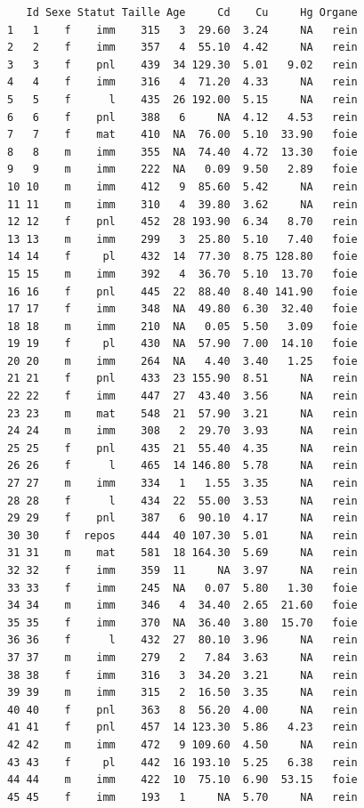 \documentclass[
  a4paper,
  DIV=11,
  numbers=noendperiod,
  oneside]{scrreprt}
\begin{document}
\begin{verbatim}
   Id Sexe Statut Taille Age     Cd    Cu     Hg Organe
1   1    f    imm    315   3  29.60  3.24     NA   rein
2   2    f    imm    357   4  55.10  4.42     NA   rein
3   3    f    pnl    439  34 129.30  5.01   9.02   rein
4   4    f    imm    316   4  71.20  4.33     NA   rein
5   5    f      l    435  26 192.00  5.15     NA   rein
6   6    f    pnl    388   6     NA  4.12   4.53   rein
7   7    f    mat    410  NA  76.00  5.10  33.90   foie
8   8    m    imm    355  NA  74.40  4.72  13.30   foie
9   9    m    imm    222  NA   0.09  9.50   2.89   foie
10 10    m    imm    412   9  85.60  5.42     NA   rein
11 11    m    imm    310   4  39.80  3.62     NA   rein
12 12    f    pnl    452  28 193.90  6.34   8.70   rein
13 13    m    imm    299   3  25.80  5.10   7.40   foie
14 14    f     pl    432  14  77.30  8.75 128.80   foie
15 15    m    imm    392   4  36.70  5.10  13.70   foie
16 16    f    pnl    445  22  88.40  8.40 141.90   foie
17 17    f    imm    348  NA  49.80  6.30  32.40   foie
18 18    m    imm    210  NA   0.05  5.50   3.09   foie
19 19    f     pl    430  NA  57.90  7.00  14.10   foie
20 20    m    imm    264  NA   4.40  3.40   1.25   foie
21 21    f    pnl    433  23 155.90  8.51     NA   rein
22 22    f    imm    447  27  43.40  3.56     NA   rein
23 23    m    mat    548  21  57.90  3.21     NA   rein
24 24    m    imm    308   2  29.70  3.93     NA   rein
25 25    f    pnl    435  21  55.40  4.35     NA   rein
26 26    f      l    465  14 146.80  5.78     NA   rein
27 27    m    imm    334   1   1.55  3.35     NA   rein
28 28    f      l    434  22  55.00  3.53     NA   rein
29 29    f    pnl    387   6  90.10  4.17     NA   rein
30 30    f  repos    444  40 107.30  5.01     NA   rein
31 31    m    mat    581  18 164.30  5.69     NA   rein
32 32    f    imm    359  11     NA  3.97     NA   rein
33 33    f    imm    245  NA   0.07  5.80   1.30   foie
34 34    m    imm    346   4  34.40  2.65  21.60   foie
35 35    f    imm    370  NA  36.40  3.80  15.70   foie
36 36    f      l    432  27  80.10  3.96     NA   rein
37 37    m    imm    279   2   7.84  3.63     NA   rein
38 38    f    imm    316   3  34.20  3.21     NA   rein
39 39    m    imm    315   2  16.50  3.35     NA   rein
40 40    f    pnl    363   8  56.20  4.00     NA   rein
41 41    f    pnl    457  14 123.30  5.86   4.23   rein
42 42    m    imm    472   9 109.60  4.50     NA   rein
43 43    f     pl    442  16 193.10  5.25   6.38   rein
44 44    m    imm    422  10  75.10  6.90  53.15   foie
45 45    f    imm    193   1     NA  5.70     NA   rein

\end{verbatim}
\end{document}

